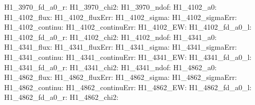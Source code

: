 H1\_3970\_fd\_a0\_r:  \newline 
H1\_3970\_chi2:  \newline 
H1\_3970\_ndof:  \newline 
H1\_4102\_a0:  \newline 
H1\_4102\_flux:  \newline 
H1\_4102\_fluxErr:  \newline 
H1\_4102\_sigma:  \newline 
H1\_4102\_sigmaErr:  \newline 
H1\_4102\_continu:  \newline 
H1\_4102\_continuErr:  \newline 
H1\_4102\_EW:  \newline 
H1\_4102\_fd\_a0\_l:  \newline 
H1\_4102\_fd\_a0\_r:  \newline 
H1\_4102\_chi2:  \newline 
H1\_4102\_ndof:  \newline 
H1\_4341\_a0:  \newline 
H1\_4341\_flux:  \newline 
H1\_4341\_fluxErr:  \newline 
H1\_4341\_sigma:  \newline 
H1\_4341\_sigmaErr:  \newline 
H1\_4341\_continu:  \newline 
H1\_4341\_continuErr:  \newline 
H1\_4341\_EW:  \newline 
H1\_4341\_fd\_a0\_l:  \newline 
H1\_4341\_fd\_a0\_r:  \newline 
H1\_4341\_chi2:  \newline 
H1\_4341\_ndof:  \newline 
H1\_4862\_a0:  \newline 
H1\_4862\_flux:  \newline 
H1\_4862\_fluxErr:  \newline 
H1\_4862\_sigma:  \newline 
H1\_4862\_sigmaErr:  \newline 
H1\_4862\_continu:  \newline 
H1\_4862\_continuErr:  \newline 
H1\_4862\_EW:  \newline 
H1\_4862\_fd\_a0\_l:  \newline 
H1\_4862\_fd\_a0\_r:  \newline 
H1\_4862\_chi2:  \newline 

